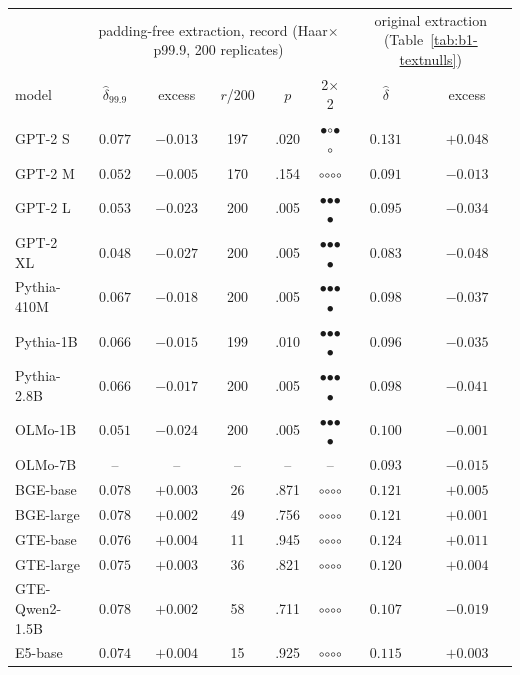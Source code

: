 \begin{table}[H]
\centering
\scriptsize
\setlength{\tabcolsep}{2.5pt}
\begin{tabular}{lccccc|cc}
\toprule
& \multicolumn{5}{c|}{padding-free extraction, record (Haar$\times$p99.9, 200 replicates)} & \multicolumn{2}{c}{original extraction (Table~\ref{tab:b1-textnulls})} \\
model & $\hat\delta_{99.9}$ & excess & $r$/200 & $p$ & 2$\times$2 & $\hat\delta$ & excess \\
\midrule
GPT-2 S & $0.077$ & $-0.013$ & 197 & .020 & $\bullet$$\circ$$\bullet$$\circ$ & $0.131$ & $+0.048$ \\
GPT-2 M & $0.052$ & $-0.005$ & 170 & .154 & $\circ$$\circ$$\circ$$\circ$ & $0.091$ & $-0.013$ \\
GPT-2 L & $0.053$ & $-0.023$ & 200 & .005 & $\bullet$$\bullet$$\bullet$$\bullet$ & $0.095$ & $-0.034$ \\
GPT-2 XL & $0.048$ & $-0.027$ & 200 & .005 & $\bullet$$\bullet$$\bullet$$\bullet$ & $0.083$ & $-0.048$ \\
Pythia-410M & $0.067$ & $-0.018$ & 200 & .005 & $\bullet$$\bullet$$\bullet$$\bullet$ & $0.098$ & $-0.037$ \\
Pythia-1B & $0.066$ & $-0.015$ & 199 & .010 & $\bullet$$\bullet$$\bullet$$\bullet$ & $0.096$ & $-0.035$ \\
Pythia-2.8B & $0.066$ & $-0.017$ & 200 & .005 & $\bullet$$\bullet$$\bullet$$\bullet$ & $0.098$ & $-0.041$ \\
OLMo-1B & $0.051$ & $-0.024$ & 200 & .005 & $\bullet$$\bullet$$\bullet$$\bullet$ & $0.100$ & $-0.001$ \\
OLMo-7B & -- & -- & -- & -- & -- & $0.093$ & $-0.015$ \\
BGE-base & $0.078$ & $+0.003$ & 26 & .871 & $\circ$$\circ$$\circ$$\circ$ & $0.121$ & $+0.005$ \\
BGE-large & $0.078$ & $+0.002$ & 49 & .756 & $\circ$$\circ$$\circ$$\circ$ & $0.121$ & $+0.001$ \\
GTE-base & $0.076$ & $+0.004$ & 11 & .945 & $\circ$$\circ$$\circ$$\circ$ & $0.124$ & $+0.011$ \\
GTE-large & $0.075$ & $+0.003$ & 36 & .821 & $\circ$$\circ$$\circ$$\circ$ & $0.120$ & $+0.004$ \\
GTE-Qwen2-1.5B & $0.078$ & $+0.002$ & 58 & .711 & $\circ$$\circ$$\circ$$\circ$ & $0.107$ & $-0.019$ \\
E5-base & $0.074$ & $+0.004$ & 15 & .925 & $\circ$$\circ$$\circ$$\circ$ & $0.115$ & $+0.003$ \\

\end{tabular}
\end{table}
